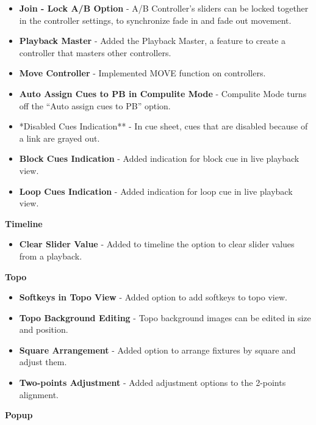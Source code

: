 \documentclass[
]{article}
\providecommand{\tightlist}{%
  \setlength{\itemsep}{0pt}\setlength{\parskip}{0pt}}
\begin{document}
\begin{itemize}
\item
  \textbf{Join - Lock A/B Option} - A/B Controller's sliders can be locked together in the controller settings, to synchronize fade in and fade out movement.
\item
  \textbf{Playback Master} - Added the Playback Master, a feature to create a controller that masters other controllers.
\item
  \textbf{Move Controller} - Implemented MOVE function on controllers.
\item
  \textbf{Auto Assign Cues to PB in Compulite Mode} - Compulite Mode turns off the ``Auto assign cues to PB'' option.
\item
  *Disabled Cues Indication** - In cue sheet, cues that are disabled because of a link are grayed out.
\item
  \textbf{Block Cues Indication} - Added indication for block cue in live playback view.
\item
  \textbf{Loop Cues Indication} - Added indication for loop cue in live playback view.
\end{itemize}

\textbf{Timeline}

\begin{itemize}
\tightlist
\item
  \textbf{Clear Slider Value} - Added to timeline the option to clear slider values from a playback.
\end{itemize}

\textbf{Topo}

\begin{itemize}
\item
  \textbf{Softkeys in Topo View} - Added option to add softkeys to topo view.
\item
  \textbf{Topo Background Editing} - Topo background images can be edited in size and position.
\item
  \textbf{Square Arrangement} - Added option to arrange fixtures by square and adjust them.
\item
  \textbf{Two-points Adjustment} - Added adjustment options to the 2-points alignment.
\end{itemize}

\textbf{Popup}
\end{document}
